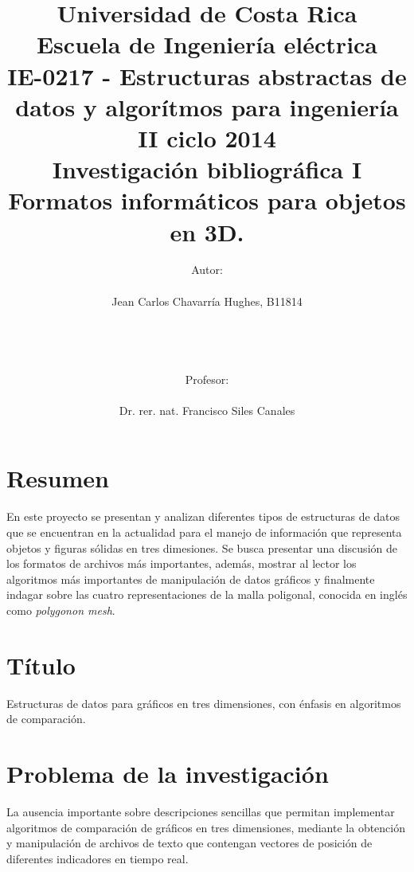 \documentclass[11pt,letterpaper]{article}     %
\author{Autor: \\ \\Jean Carlos Chavarría Hughes, B11814\\ \\ \\ \\ \\Profesor:\\ \\Dr. rer. nat. Francisco Siles Canales \vspace*{2.0in}}
\title{Universidad de Costa Rica\\{\small Escuela de Ingeniería eléctrica\\ IE-0217 - Estructuras abstractas de datos y algor\' itmos para ingeniería\\II ciclo 2014\\\vspace*{0.55in} Investigación bibliográfica I}\\ Formatos informáticos para objetos en 3D.
\vspace*{1.35in}}
\begin{document}

\maketitle
\newpage
\tableofcontents
\newpage
\listoffigures
\newpage

\section{Resumen}
En este proyecto se presentan y analizan diferentes tipos de estructuras de datos que se encuentran en la actualidad para el manejo de informaci\' on que representa objetos y figuras s\' olidas en tres dimesiones. Se busca presentar una discusi\' on de los formatos de archivos m\' as importantes, adem\' as, mostrar al lector los algoritmos m\' as importantes de manipulaci\' on de datos gr\' aficos y finalmente indagar sobre las cuatro representaciones de la malla poligonal, conocida en ingl\' es como \textit{polygonon mesh}.


\section{T\' itulo}
Estructuras de datos para gr\' aficos en tres dimensiones, con \' enfasis en algoritmos de comparaci\' on.

\section{Problema de la investigaci\' on}
La ausencia importante sobre descripciones sencillas que permitan implementar algoritmos de comparaci\' on de gr\' aficos en tres dimensiones, mediante la obtenci\' on y manipulaci\' on de archivos de texto que contengan vectores de posici\' on de diferentes indicadores en tiempo real. 
\end{document}
